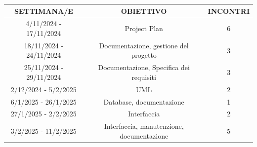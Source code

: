 \documentclass[a4paper,12pt]{article}
\begin{document}
\begin{center}
\begin{tabular}{|c|c|c|}
\hline
\textbf{SETTIMANA/E} & \textbf{OBIETTIVO} & \textbf{INCONTRI } \\
\hline
4/11/2024 - 17/11/2024 & Project Plan & 6 \\
\hline
18/11/2024 - 24/11/2024 & Documentazione, gestione del progetto & 3 \\
\hline
25/11/2024 - 29/11/2024 & Documentazione, Specifica dei requisiti  & 3 \\
\hline
2/12/2024 - 5/2/2025 & UML & 2 \\
\hline
6/1/2025 - 26/1/2025 & Database, documentazione & 1 \\
\hline
27/1/2025 - 2/2/2025 & Interfaccia & 2 \\
\hline
3/2/2025 - 11/2/2025 & Interfaccia, manutenzione, documentazione & 5 \\
\hline


\end{tabular}
\end{center}
\end{document}
